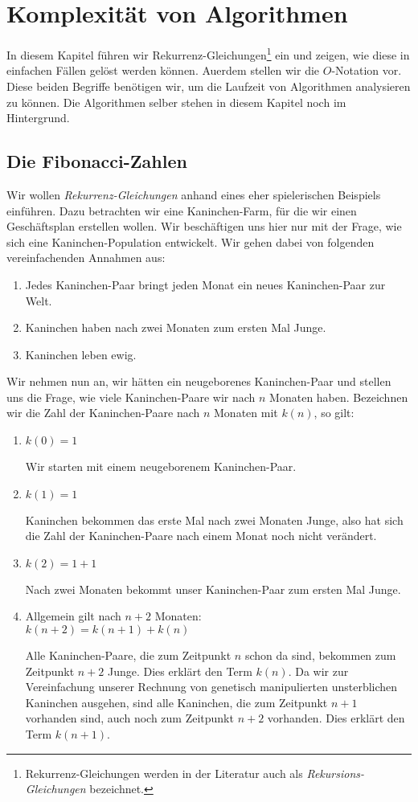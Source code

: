\chapter{Komplexit\"at von Algorithmen} 
In diesem Kapitel f\"uhren wir 
Rekurrenz-Gleichungen\footnote{
Rekurrenz-Gleichungen werden in der Literatur auch als \emph{Rekursions-Gleichungen} bezeichnet.}
ein und zeigen, wie diese in einfachen F\"allen gel\"ost werden k\"onnen.  Au\3erdem stellen wir
die $O$-Notation vor.  Diese beiden Begriffe ben\"otigen wir, um die Laufzeit von
Algorithmen analysieren zu k\"onnen.  Die Algorithmen selber stehen in diesem Kapitel noch
im Hintergrund.

\section{Die Fibonacci-Zahlen}
Wir wollen \emph{Rekurrenz-Gleichungen} anhand eines eher spielerischen Beispiels
einf\"uhren.  Dazu betrachten wir eine Kaninchen-Farm, f\"ur die wir einen Gesch\"aftsplan
erstellen wollen.   Wir besch\"aftigen uns hier nur mit der Frage, wie sich eine
Kaninchen-Population entwickelt.  Wir gehen dabei von folgenden vereinfachenden Annahmen aus:
\begin{enumerate}
\item Jedes Kaninchen-Paar bringt jeden Monat ein neues Kaninchen-Paar zur Welt.
\item Kaninchen haben nach zwei Monaten zum ersten Mal Junge.
\item Kaninchen leben ewig.
\end{enumerate}
Wir nehmen nun an, wir h\"atten ein neugeborenes Kaninchen-Paar und stellen uns die Frage, wie
viele Kaninchen-Paare wir nach $n$ Monaten haben.  Bezeichnen wir die Zahl der
Kaninchen-Paare nach $n$ Monaten mit $k(n)$, so gilt:
\begin{enumerate}
\item $k(0) = 1$

      Wir starten mit einem neugeborenem Kaninchen-Paar.
\item $k(1) = 1$

      Kaninchen bekommen das erste Mal nach zwei Monaten Junge, also hat sich die Zahl
      der Kaninchen-Paare nach einem Monat noch nicht ver\"andert.
\item $k(2) = 1 + 1$

      Nach zwei Monaten bekommt unser Kaninchen-Paar zum ersten Mal Junge.
\item Allgemein gilt nach $n + 2$ Monaten: \\[0.1cm]
      \hspace*{1.3cm} 
      $k(n+2) = k(n+1) + k(n)$

      Alle Kaninchen-Paare, die zum Zeitpunkt $n$ schon da sind, bekommen zum Zeitpunkt
      $n+2$ Junge. Dies erkl\"art den Term $k(n)$.  Da wir zur Vereinfachung unserer
      Rechnung von genetisch manipulierten unsterblichen Kaninchen ausgehen, sind alle
      Kaninchen, die zum Zeitpunkt $n+1$ vorhanden sind, auch noch zum Zeitpunkt $n+2$
      vorhanden. Dies erkl\"art den Term $k(n+1)$. 
\end{enumerate}

